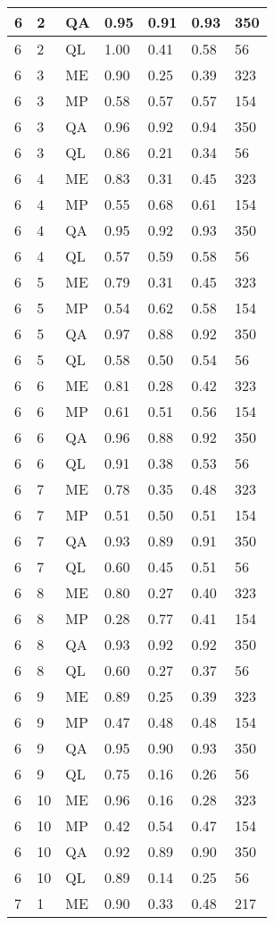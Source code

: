 \begin{table}[!ht]
\begin{tabularx}{300pt}{|X|X|X|X|X|X|X|}
\hline
6&2&QA&0.95&0.91&0.93&350\\
\hline
6&2&QL&1.00&0.41&0.58&56\\
\hline
6&3&ME&0.90&0.25&0.39&323\\
\hline
6&3&MP&0.58&0.57&0.57&154\\
\hline
6&3&QA&0.96&0.92&0.94&350\\
\hline
6&3&QL&0.86&0.21&0.34&56\\
\hline
6&4&ME&0.83&0.31&0.45&323\\
\hline
6&4&MP&0.55&0.68&0.61&154\\
\hline
6&4&QA&0.95&0.92&0.93&350\\
\hline
6&4&QL&0.57&0.59&0.58&56\\
\hline
6&5&ME&0.79&0.31&0.45&323\\
\hline
6&5&MP&0.54&0.62&0.58&154\\
\hline
6&5&QA&0.97&0.88&0.92&350\\
\hline
6&5&QL&0.58&0.50&0.54&56\\
\hline
6&6&ME&0.81&0.28&0.42&323\\
\hline
6&6&MP&0.61&0.51&0.56&154\\
\hline
6&6&QA&0.96&0.88&0.92&350\\
\hline
6&6&QL&0.91&0.38&0.53&56\\
\hline
6&7&ME&0.78&0.35&0.48&323\\
\hline
6&7&MP&0.51&0.50&0.51&154\\
\hline
6&7&QA&0.93&0.89&0.91&350\\
\hline
6&7&QL&0.60&0.45&0.51&56\\
\hline
6&8&ME&0.80&0.27&0.40&323\\
\hline
6&8&MP&0.28&0.77&0.41&154\\
\hline
6&8&QA&0.93&0.92&0.92&350\\
\hline
6&8&QL&0.60&0.27&0.37&56\\
\hline
6&9&ME&0.89&0.25&0.39&323\\
\hline
6&9&MP&0.47&0.48&0.48&154\\
\hline
6&9&QA&0.95&0.90&0.93&350\\
\hline
6&9&QL&0.75&0.16&0.26&56\\
\hline
6&10&ME&0.96&0.16&0.28&323\\
\hline
6&10&MP&0.42&0.54&0.47&154\\
\hline
6&10&QA&0.92&0.89&0.90&350\\
\hline
6&10&QL&0.89&0.14&0.25&56\\
\hline
7&1&ME&0.90&0.33&0.48&217\\

\end{tabularx}
\end{table}
